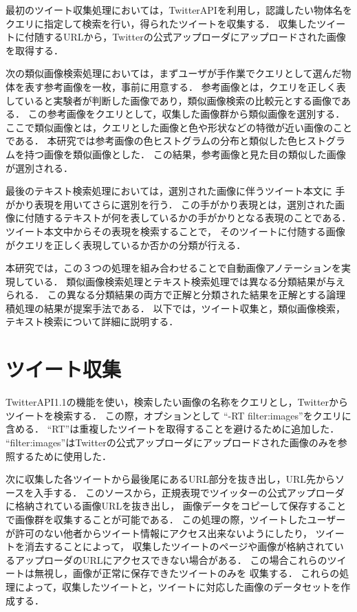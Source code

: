 
最初のツイート収集処理においては，TwitterAPIを利用し，認識したい物体名をクエリに指定して検索を行い，得られたツイートを収集する．
収集したツイートに付随するURLから，Twitterの公式アップローダにアップロードされた画像を取得する．

次の類似画像検索処理においては，まずユーザが手作業でクエリとして選んだ物体を表す参考画像を一枚，事前に用意する．
参考画像とは，クエリを正しく表していると実験者が判断した画像であり，類似画像検索の比較元とする画像である．
この参考画像をクエリとして，収集した画像群から類似画像を選別する．
ここで類似画像とは，クエリとした画像と色や形状などの特徴が近い画像のことである．
本研究では参考画像の色ヒストグラムの分布と類似した色ヒストグラムを持つ画像を類似画像とした．
この結果，参考画像と見た目の類似した画像が選別される．

最後のテキスト検索処理においては，選別された画像に伴うツイート本文に
手がかり表現を用いてさらに選別を行う．
この手がかり表現とは，選別された画像に付随するテキストが何を表しているかの手がかりとなる表現のことである．
ツイート本文中からその表現を検索することで，
そのツイートに付随する画像がクエリを正しく表現しているか否かの分類が行える．

本研究では，この３つの処理を組み合わせることで自動画像アノテーションを実現している．
類似画像検索処理とテキスト検索処理では異なる分類結果が与えられる．
この異なる分類結果の両方で正解と分類された結果を正解とする論理積処理の結果が提案手法である．
以下では，ツイート収集と，類似画像検索，テキスト検索について詳細に説明する．

\section{ツイート収集}
\label{sec:tweetCollect}
TwitterAPI1.1の機能を使い，検索したい画像の名称をクエリとし，Twitterからツイートを検索する．
この際，オプションとして ``-RT filter:images''をクエリに含める．
``RT''は重複したツイートを取得することを避けるために追加した．
``filter:images''はTwitterの公式アップローダにアップロードされた画像のみを参照するために使用した．

次に収集した各ツイートから最後尾にあるURL部分を抜き出し，URL先からソースを入手する．
このソースから，正規表現でツイッターの公式アップローダに格納されている画像URLを抜き出し，
画像データをコピーして保存することで画像群を収集することが可能である．
この処理の際，ツイートしたユーザーが許可のない他者からツイート情報にアクセス出来ないようにしたり，
ツイートを消去することによって，
収集したツイートのページや画像が格納されているアップローダのURLにアクセスできない場合がある．
この場合これらのツイートは無視し，画像が正常に保存できたツイートのみを
収集する．
これらの処理によって，収集したツイートと，ツイートに対応した画像のデータセットを作成する．


